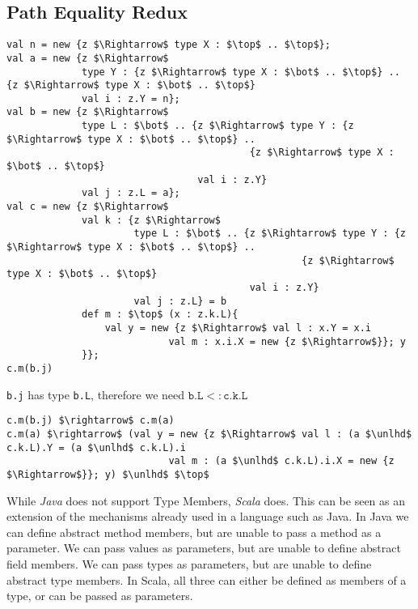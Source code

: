 \documentclass{llncs}
\numberwithin{subcase}{casethm}
\numberwithin{casethm}{theorem}
\numberwithin{casethm}{lemma}
\begin{document}
\subsection{Path Equality Redux}
\begin{lstlisting}[mathescape, style=custom_lang]
val n = new {z $\Rightarrow$ type X : $\top$ .. $\top$};
val a = new {z $\Rightarrow$
             type Y : {z $\Rightarrow$ type X : $\bot$ .. $\top$} .. {z $\Rightarrow$ type X : $\bot$ .. $\top$}
             val i : z.Y = n};
val b = new {z $\Rightarrow$
             type L : $\bot$ .. {z $\Rightarrow$ type Y : {z $\Rightarrow$ type X : $\bot$ .. $\top$} .. 
                                          {z $\Rightarrow$ type X : $\bot$ .. $\top$}
                                 val i : z.Y}
             val j : z.L = a};
val c = new {z $\Rightarrow$
             val k : {z $\Rightarrow$
                      type L : $\bot$ .. {z $\Rightarrow$ type Y : {z $\Rightarrow$ type X : $\bot$ .. $\top$} .. 
                                                   {z $\Rightarrow$ type X : $\bot$ .. $\top$}
                                          val i : z.Y}
                      val j : z.L} = b
             def m : $\top$ (x : z.k.L){
                 val y = new {z $\Rightarrow$ val l : x.Y = x.i 
                            val m : x.i.X = new {z $\Rightarrow$}}; y
             }};
c.m(b.j)
\end{lstlisting}
\texttt{b.j} has type \texttt{b.L}, therefore we need 
$\texttt{b.L} <: \texttt{c.k.L}$
\begin{lstlisting}[mathescape, style=custom_lang]
c.m(b.j) $\rightarrow$ c.m(a)
c.m(a) $\rightarrow$ (val y = new {z $\Rightarrow$ val l : (a $\unlhd$ c.k.L).Y = (a $\unlhd$ c.k.L).i 
                            val m : (a $\unlhd$ c.k.L).i.X = new {z $\Rightarrow$}}; y) $\unlhd$ $\top$
\end{lstlisting}


\newpage


While \emph{Java} does not support Type Members, \emph{Scala} does.
This can be seen as an extension of the mechanisms already used in 
a language such as Java. In Java we can define abstract method members, but 
are unable to pass a method as a parameter. We can pass values as 
parameters, but are unable to define abstract field members. We can pass 
types as parameters, but are unable to define abstract type members.
In Scala, all three can either be defined as members of a type, or 
can be passed as parameters. 
\end{document}
